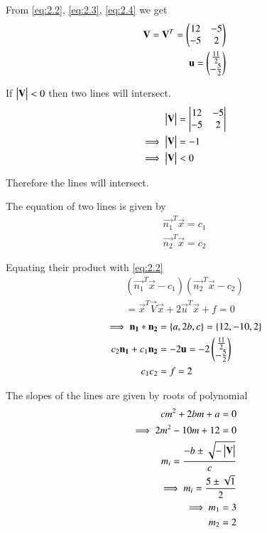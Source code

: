 \documentclass[journal,12pt,twocolumn]{IEEEtran}
\begin{document}
From \eqref{eq:2.2}, \eqref{eq:2.3}, \eqref{eq:2.4} we get
\begin{align}
    \mathbf{V}=\mathbf{V}^T=\begin{pmatrix}12 & -5 \\ -5 & 2\end{pmatrix}\label{eq:2.17}\\
    \mathbf{u}=\begin{pmatrix}\frac{11}{2} \\ -\frac{5}{2}\end{pmatrix}\label{eq:2.18}
\end{align}

If $\begin{vmatrix}\mathbf{V}\end{vmatrix}<0$ then two lines will intersect.
\begin{align}
    \begin{vmatrix}\mathbf{V}\end{vmatrix}&=\begin{vmatrix}12 & -5 \\ -5 & 2\end{vmatrix}\\
    \implies\begin{vmatrix}\mathbf{V}\end{vmatrix}&=-1\\
    \implies\begin{vmatrix}\mathbf{V}\end{vmatrix}&<0
\end{align}

Therefore the lines will intersect.

The equation of two lines is given by
\begin{align}
    \vec{n_1}^T\vec{x}=c_1\label{eq:2.22}\\
    \vec{n_2}^T\vec{x}=c_2\label{eq:2.23}
\end{align}

Equating their product with \eqref{eq:2.2}
\begin{multline}
    (\vec{n_1}^T\vec{x}-c_1)(\vec{n_2}^T\vec{x}-c_2)\\=\vec{x}^T\vec{V}\vec{x}+2\vec{u}^T\vec{x}+f=0
\end{multline}
\begin{align}
    \implies\mathbf{n_1}*\mathbf{n_2}&=\{a,2b,c\}=\{12,-10,2\}\label{eq:conv}\\
    c_2\mathbf{n_1}+c_1\mathbf{n_2}&=-2\mathbf{u}=-2\begin{pmatrix}\frac{11}{2} \\ -\frac{5}{2}\end{pmatrix}\label{eq:2.26}\\
    c_1c_2&=f=2
\end{align}

The slopes of the lines are given by roots of polynomial
\begin{align}
    cm^2+2bm+a=0\label{eq:poly}\\
    \implies 2m^2-10m+12=0\\
    m_i=\frac{-b\pm{\sqrt{-\ensuremath{\begin{vmatrix}\mathbf{V}\end{vmatrix}}}}}{c}\\
    \implies m_i=\frac{5\pm{\sqrt{1}}}{2}\\
    \implies m_1=3\\
     m_2=2
\end{align}
\end{document}
